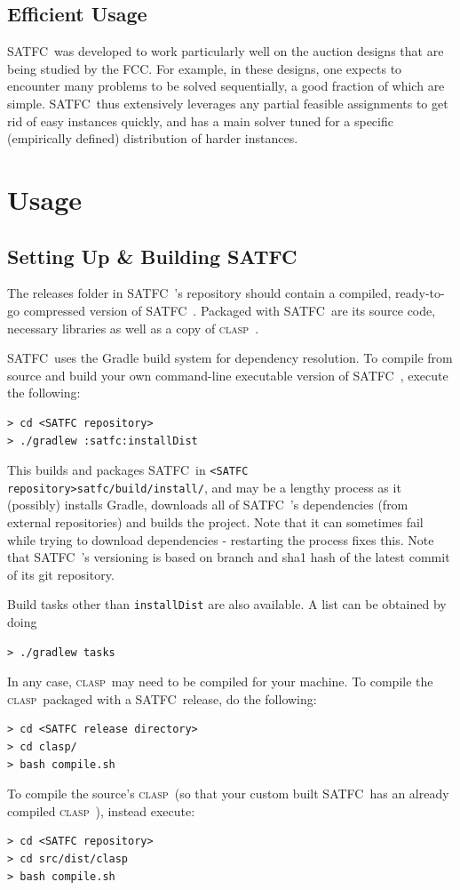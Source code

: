 \documentclass[
10pt, %
letterpaper, %
oneside, %
headinclude,footinclude, %
BCOR5mm, %
needspace, %
]{scrartcl}
\newcommand{\SATFC}{\textsc{SATFC}~}
\newcommand{\clasp}{\textsc{clasp}~}
\begin{document}
\subsection{Efficient Usage}
\SATFC was developed to work particularly well on the auction designs that are being studied by the FCC. For example, in these designs, one expects to encounter many problems to be solved sequentially, a good fraction of which are simple. \SATFC thus extensively leverages any partial feasible assignments to get rid of easy instances quickly, and has a main solver tuned for a specific (empirically defined) distribution of harder instances.

\section{Usage}\label{sec:usage}

\subsection{Setting Up \& Building \SATFC}

The releases folder in \SATFC's repository should contain a compiled, ready-to-go compressed version of \SATFC. Packaged with \SATFC are its source code, necessary libraries as well as a copy of \clasp. 

\SATFC uses the Gradle build system for dependency resolution. To compile from source and build your own command-line executable version of \SATFC, execute the following:
\begin{lstlisting}[style=Bash]
> cd <SATFC repository>
> ./gradlew :satfc:installDist
\end{lstlisting}
This builds and packages \SATFC in \texttt{<SATFC repository>satfc/build/install/}, and may be a lengthy process as it (possibly) installs Gradle, downloads all of \SATFC's dependencies (from external repositories) and builds the project. Note that it can sometimes fail while trying to download dependencies - restarting the process fixes this. Note that \SATFC's versioning is based on branch and sha1 hash of the latest commit of its git repository. 

Build tasks other than \texttt{installDist} are also available. A list can be obtained by doing
\begin{lstlisting}[style=Bash]
> ./gradlew tasks
\end{lstlisting}

In any case, \clasp may need to be compiled for your machine. To compile the \clasp packaged with a \SATFC release, do the following:
\begin{lstlisting}[style=Bash]
> cd <SATFC release directory>
> cd clasp/
> bash compile.sh
\end{lstlisting}
To compile the source's \clasp (so that your custom built \SATFC has an already compiled \clasp), instead execute:
\begin{lstlisting}[style=Bash]
> cd <SATFC repository>
> cd src/dist/clasp
> bash compile.sh
\end{lstlisting}
\end{document}
